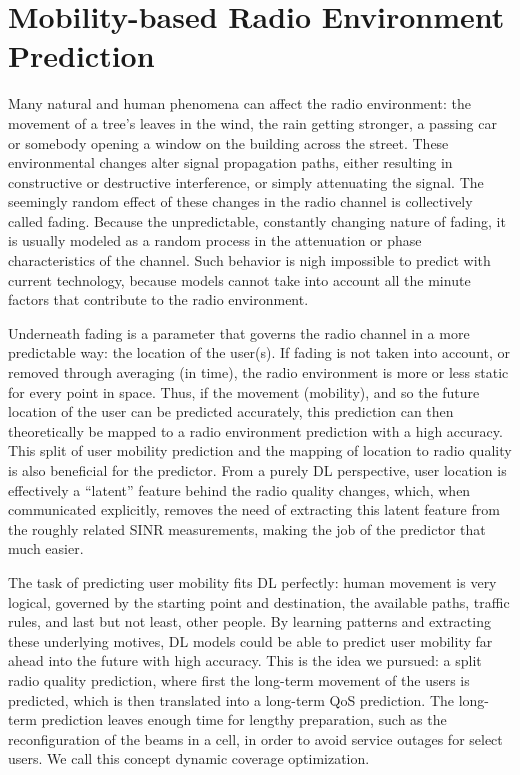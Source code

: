 \chapter{Mobility-based Radio Environment Prediction}
	\label{cha:pred_control}
	
	Many natural and human phenomena can affect the radio environment: the movement of a tree's leaves in the wind, the rain getting stronger, a passing car or somebody opening a window on the building across the street.
	These environmental changes alter signal propagation paths, either resulting in constructive or destructive interference, or simply attenuating the signal.
	The seemingly random effect of these changes in the radio channel is collectively called fading.
	Because the unpredictable, constantly changing nature of fading, it is usually modeled as a random process in the attenuation or phase characteristics of the channel.
	Such behavior is nigh impossible to predict with current technology, because models cannot take into account all the minute factors that contribute to the radio environment.
	
	Underneath fading is a parameter that governs the radio channel in a more predictable way: the location of the user(s).
	If fading is not taken into account, or removed through averaging (in time), the radio environment is more or less static for every point in space.
	Thus, if the movement (mobility), and so the future location of the user can be predicted accurately, this prediction can then theoretically be mapped to a radio environment prediction with a high accuracy.
	This split of user mobility prediction and the mapping of location to radio quality is also beneficial for the predictor.
	From a purely \ac{DL} perspective, user location is effectively a ``latent'' feature behind the radio quality changes, which, when communicated explicitly, removes the need of extracting this latent feature from the roughly related \ac{SINR} measurements, making the job of the predictor that much easier.
	
	The task of predicting user mobility fits \ac{DL} perfectly: human movement is very logical, governed by the starting point and destination, the available paths, traffic rules, and last but not least, other people. 
	By learning patterns and extracting these underlying motives, \ac{DL} models could be able to predict user mobility far ahead into the future with high accuracy.
	This is the idea we pursued: a split radio quality prediction, where first the long-term movement of the users is predicted, which is then translated into a long-term \ac{QoS} prediction.	
	The long-term prediction leaves enough time for lengthy preparation, such as the reconfiguration of the beams in a cell, in order to avoid service outages for select users.
	We call this concept dynamic coverage optimization.
	
